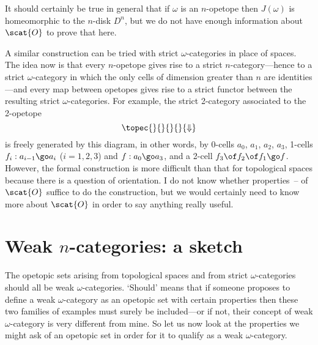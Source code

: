 It should certainly be true in general that if $\omega$ is an $n$-opetope
then $J(\omega)$ is homeomorphic to the $n$-disk $D^n$, but we do not have
enough information about $\scat{O}$ to prove that here.

A similar construction can be tried with strict $\omega$-categories in
place of spaces.  The idea now is that every $n$-opetope gives rise to a
strict $n$-category---hence%
%  
%
%
%
%
%
to a strict $\omega$-category in which the only cells of dimension greater
than $n$ are identities---and every map between opetopes gives rise to a
strict functor between the resulting strict $\omega$-categories.  For
example, the strict 2-category associated to the 2-opetope
\[
\topec{}{}{}{}{\Downarrow}
\]
is freely generated by this diagram, in other words, by 0-cells $a_0$,
$a_1$, $a_2$, $a_3$, 1-cells $f_i: a_{i-1} \go a_i$ ($i = 1, 2, 3$) and
$f: a_0 \go a_3$, and a 2-cell $f_3\of f_2\of f_1 \go f$.  However, the
formal construction is more difficult than that for topological spaces
because there is a question of orientation.  I do not know whether
properties~-- of $\scat{O}$
suffice to do the construction, but we would certainly need to know more
about $\scat{O}$ in order to say anything really useful.



\section{Weak $n$-categories: a sketch}

The opetopic sets arising from topological spaces and from strict
$\omega$-categories should all be weak $\omega$-categories.  `Should' means
that if someone proposes to define%
%
% 
a weak $\omega$-category as an opetopic
set with certain properties then these two families of examples must surely
be included---or if not, their concept of weak $\omega$-category is very
different from mine.  So let us now look at the properties we might ask of
an opetopic set in order for it to qualify as a weak $\omega$-category.


